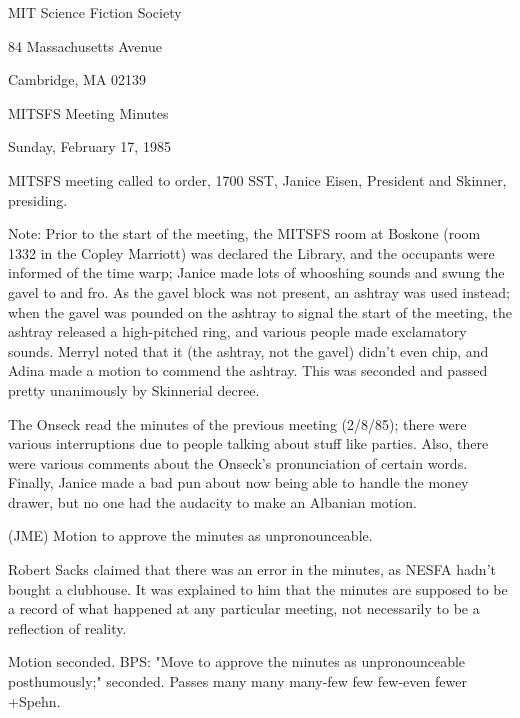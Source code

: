 \documentclass[12pt]{article}
\begin{document}
\begin{center}

MIT Science Fiction Society 

84 Massachusetts Avenue

Cambridge, MA 02139

\vspace{12pt}

MITSFS Meeting Minutes 

Sunday, February 17, 1985

\end{center}
 
\vspace{18pt}

\setlength{\parskip}{6pt}

\noindent
MITSFS meeting called to order, 1700 SST,
Janice Eisen, President and Skinner, presiding.

Note: Prior to the start of the meeting, the MITSFS room at Boskone (room 1332 in the Copley Marriott) was declared the Library, and the occupants were informed of the time warp; Janice made lots of whooshing sounds and swung the gavel to and fro. As the gavel block was not present, an ashtray was used instead; when the gavel was pounded on the ashtray to signal the start of the meeting, the ashtray released a high-pitched ring, and various people made exclamatory sounds. Merryl noted that it (the ashtray, not the gavel) didn't even chip, and Adina made a motion to commend the ashtray. This was seconded and passed pretty unanimously by Skinnerial decree.

The Onseck read the minutes of the previous meeting (2/8/85); there were various interruptions due to people talking about stuff like parties. Also, there were various comments about the Onseck's pronunciation of certain words. Finally, Janice made a bad pun about now being able to handle the money drawer, but no one had the audacity to make an Albanian motion.

(JME) Motion to approve the minutes as unpronounceable.

Robert Sacks claimed that there was an error in the minutes, as NESFA hadn't bought a clubhouse. It was explained to him that the minutes are supposed to be a record of what happened at any particular meeting, not necessarily to be a reflection of reality.

Motion seconded. BPS: "Move to approve the minutes as unpronounceable posthumously;" seconded. Passes many many many-few few few-even fewer +Spehn.
\end{document}
